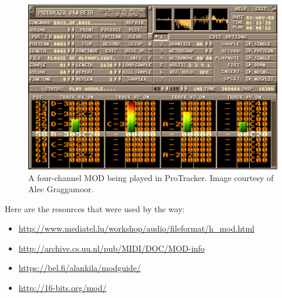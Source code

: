 \begin{figure}[H]
	\includegraphics[width = \textwidth]{images/Protracker.png}
	\caption{A four-channel MOD being played in ProTracker. Image courtesy of Alec Graggamoor.}
	\label{img-protracker}
\end{figure}

Here are the resources that were used by the way:
\begin{itemize}
	\item{\url{http://www.mediatel.lu/workshop/audio/fileformat/h_mod.html}}
	\item{\url{http://archive.cs.uu.nl/pub/MIDI/DOC/MOD-info}}
	\item{\url{https://bel.fi/alankila/modguide/}}
	\item{\url{http://16-bits.org/mod/}}
\end{itemize}

\newpage
